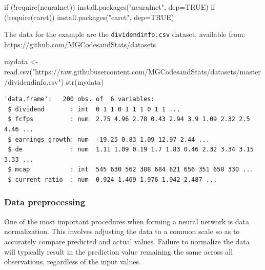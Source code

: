 \documentclass[
  letterpaper,
  DIV=11,
  numbers=noendperiod,
  oneside]{scrartcl}
\newenvironment{Shaded}{\begin{snugshade}}{\end{snugshade}}
\newcommand{\AttributeTok}[1]{\textcolor[rgb]{0.40,0.45,0.13}{#1}}
\newcommand{\ConstantTok}[1]{\textcolor[rgb]{0.56,0.35,0.01}{#1}}
\newcommand{\ControlFlowTok}[1]{\textcolor[rgb]{0.00,0.23,0.31}{#1}}
\newcommand{\FunctionTok}[1]{\textcolor[rgb]{0.28,0.35,0.67}{#1}}
\newcommand{\NormalTok}[1]{\textcolor[rgb]{0.00,0.23,0.31}{#1}}
\newcommand{\OtherTok}[1]{\textcolor[rgb]{0.00,0.23,0.31}{#1}}
\newcommand{\SpecialCharTok}[1]{\textcolor[rgb]{0.37,0.37,0.37}{#1}}
\newcommand{\StringTok}[1]{\textcolor[rgb]{0.13,0.47,0.30}{#1}}
\begin{document}
\begin{Shaded}
\begin{Highlighting}[]
\ControlFlowTok{if}\NormalTok{ (}\SpecialCharTok{!}\FunctionTok{require}\NormalTok{(neuralnet)) }
  \FunctionTok{install.packages}\NormalTok{(}\StringTok{"neuralnet"}\NormalTok{, }\AttributeTok{dep=}\ConstantTok{TRUE}\NormalTok{)}
\ControlFlowTok{if}\NormalTok{ (}\SpecialCharTok{!}\FunctionTok{require}\NormalTok{(caret)) }
  \FunctionTok{install.packages}\NormalTok{(}\StringTok{"caret"}\NormalTok{, }\AttributeTok{dep=}\ConstantTok{TRUE}\NormalTok{)}
\end{Highlighting}
\end{Shaded}

The data for the example are the \texttt{dividendinfo.csv} dataset,
available from: \url{https://github.com/MGCodesandStats/datasets}

\begin{Shaded}
\begin{Highlighting}[]
\NormalTok{mydata }\OtherTok{\textless{}{-}} \FunctionTok{read.csv}\NormalTok{(}\StringTok{"https://raw.githubusercontent.com/MGCodesandStats/datasets/master/dividendinfo.csv"}\NormalTok{)}
\FunctionTok{str}\NormalTok{(mydata)}
\end{Highlighting}
\end{Shaded}

\begin{verbatim}
'data.frame':   200 obs. of  6 variables:
 $ dividend       : int  0 1 1 0 1 1 1 0 1 1 ...
 $ fcfps          : num  2.75 4.96 2.78 0.43 2.94 3.9 1.09 2.32 2.5 4.46 ...
 $ earnings_growth: num  -19.25 0.83 1.09 12.97 2.44 ...
 $ de             : num  1.11 1.09 0.19 1.7 1.83 0.46 2.32 3.34 3.15 3.33 ...
 $ mcap           : int  545 630 562 388 684 621 656 351 658 330 ...
 $ current_ratio  : num  0.924 1.469 1.976 1.942 2.487 ...
\end{verbatim}

\hypertarget{data-preprocessing}{%
\subsubsection{Data preprocessing}\label{data-preprocessing}}

One of the most important procedures when forming a neural network is
data normalization. This involves adjusting the data to a common scale
so as to accurately compare predicted and actual values. Failure to
normalize the data will typically result in the prediction value
remaining the same across all observations, regardless of the input
values.
\end{document}
